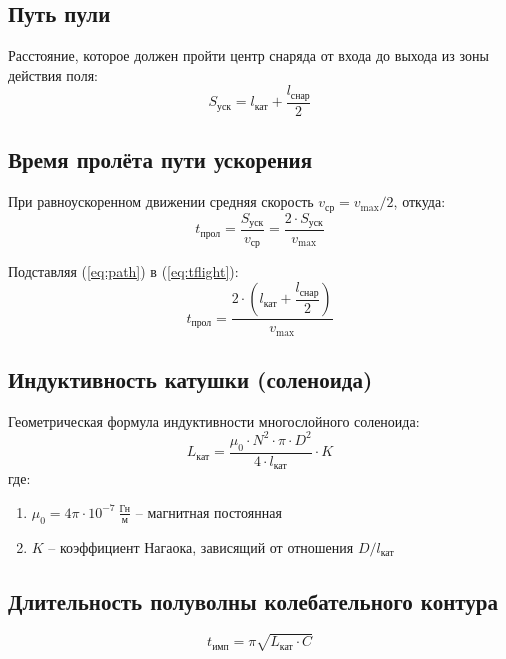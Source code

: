 \documentclass[14pt]{extarticle}
\begin{document}
\subsection{Путь пули}
Расстояние, которое должен пройти центр снаряда от входа до выхода из зоны действия поля:
\begin{equation}
    S_{\text{уск}} = l_{\text{кат}} + \frac{l_{\text{снар}}}{2}
    \label{eq:path}
\end{equation}

\subsection{Время пролёта пути ускорения}
При равноускоренном движении средняя скорость $v_{\text{ср}} = v_{\max}/2$, откуда:
\begin{equation}
    t_{\text{прол}} = \frac{S_{\text{уск}}}{v_{\text{ср}}} = \frac{2 \cdot S_{\text{уск}}}{v_{\max}}
    \label{eq:tflight}
\end{equation}

Подставляя (\ref{eq:path}) в (\ref{eq:tflight}):
\begin{equation}
    t_{\text{прол}} = \frac{2 \cdot \left(l_{\text{кат}} + \dfrac{l_{\text{снар}}}{2}\right)}{v_{\max}}
    \label{eq:tflight_expanded}
\end{equation}

\subsection{Индуктивность катушки (соленоида)}
Геометрическая формула индуктивности многослойного соленоида:
\begin{equation}
    L_{\text{кат}} = \frac{\mu_0 \cdot N^2 \cdot \pi \cdot D^2}{4 \cdot l_{\text{кат}}} \cdot K
    \label{eq:inductance}
\end{equation}
где:
\begin{enumerate}
    \item $\mu_0 = 4\pi \cdot 10^{-7} \ \frac{\text{Гн}}{\text{м}}$ -- магнитная постоянная
    \item $K$ -- коэффициент Нагаока, зависящий от отношения $D/l_{\text{кат}}$
\end{enumerate}

\subsection{Длительность полуволны колебательного контура}
\begin{equation}
    t_{\text{имп}} = \pi \sqrt{L_{\text{кат}} \cdot C}
    \label{eq:thalf}
\end{equation}
\end{document}
